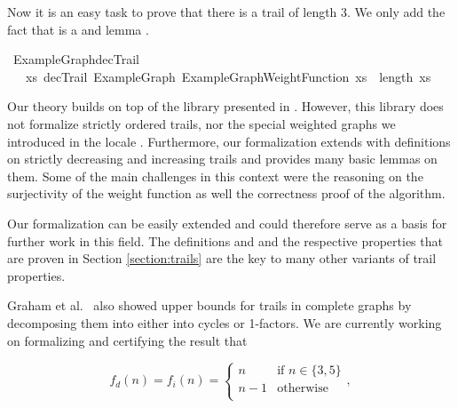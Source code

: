 \begin{isabellebody}
\isadelimproof
%
\endisadelimproof
%
\isatagproof
%
\endisatagproof
{\isafoldproof}%
%
\isadelimproof
%
\endisadelimproof
%
\begin{isamarkuptext}%
Now it is an easy task to prove that there is a trail of length 3. We only add the fact that
 is a  and lemma .%
\end{isamarkuptext}\isamarkuptrue%
\isamarkupfalse%
\ ExampleGraph{\isacharunderscore}decTrail{\isacharcolon}\isanewline
\ \ {\isachardoublequoteopen}{\isasymexists}\ xs{\isachardot}\ decTrail\ ExampleGraph\ ExampleGraphWeightFunction\ xs\ {\isasymand}\ length\ xs\ {\isacharequal}\ {}{\isachardoublequoteclose}%
\isadelimproof
%
\endisadelimproof
%
\isatagproof
%
\endisatagproof
{\isafoldproof}%
%
\isadelimproof
%
\endisadelimproof
%
\isadelimdocument
%
\endisadelimdocument
%
\isatagdocument
%
\isamarkuptrue%
%
\endisatagdocument
{\isafolddocument}%
%
\isadelimdocument
%
\endisadelimdocument
%
\begin{isamarkuptext}%
Our theory  builds on top of the  library presented in \cite{Graph_Theory-AFP}.
However, this library does not formalize strictly ordered trails, nor the special weighted graphs we 
introduced in the locale . 
Furthermore, our formalization extends \cite{Graph_Theory-AFP} with definitions on strictly decreasing and 
increasing trails and provides many basic lemmas on them. Some of the main challenges in this context 
were the reasoning on the surjectivity of the weight function as well the correctness proof of the algorithm.

Our formalization can be easily extended and could therefore serve as a basis for further work in this field.
The definitions  and  and the respective properties that are proven in 
Section \ref{section:trails} are the key to many other variants of trail properties. 

Graham et al.~\cite{graham1973increasing} also showed upper bounds for trails in complete graphs by decomposing
them into either into cycles or 1-factors. We are currently working on formalizing and certifying the result 
that 

$$
f_d(n)= f_i(n) = 
\begin{cases}
n &  \text{if } n \in \{3,5\}\\
n-1 & \text{otherwise}\\
\end{cases},
$$


\end{isamarkuptext}
\end{isabellebody}
